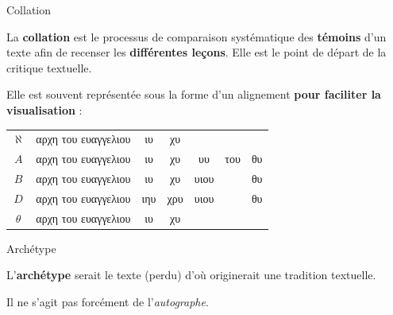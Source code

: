 \documentclass[11pt]{beamer}
\begin{document}
\begin{frame}{Collation}
    \begin{alertblock}{}
    La \textbf{collation} est le processus de comparaison systématique des \textbf{témoins} d'un texte afin de recenser les \textbf{différentes leçons}. Elle est le point de départ de la critique textuelle.
    \end{alertblock}
    Elle est souvent représentée sous la forme d'un alignement \textbf{pour faciliter la visualisation} :
\pause

\vfill
\begin{tabular}{c|c|c|c|c|c|c}
    $\aleph$ & \textgreek{αρχη του ευαγγελιου} & \textgreek{ιυ} & \textgreek{χυ} & & & \\
    $A$  & \textgreek{αρχη του ευαγγελιου} & \textgreek{ιυ}  & \textgreek{χυ} & \textgreek{υυ} & \textgreek{του} & \textgreek{θυ}\\
    $B$ & \textgreek{αρχη του ευαγγελιου} & \textgreek{ιυ} & \textgreek{χυ} & \textgreek{υιου} & & \textgreek{θυ}\\
    $D$ & \textgreek{αρχη του ευαγγελιου} & \textgreek{ιηυ} & \textgreek{χρυ} & \textgreek{υιου} & & \textgreek{θυ}\\
    $\theta$ & \textgreek{αρχη του ευαγγελιου} & \textgreek{ιυ} & \textgreek{χυ} & & & \\
\end{tabular}
\end{frame}

\begin{frame}{Archétype}
    \begin{alertblock}{}
    L'\textbf{archétype} serait le texte (perdu) d'où originerait une tradition textuelle.
    \end{alertblock}

    Il ne s'agit pas forcément de l'\emph{autographe}.
\end{frame}
\end{document}
